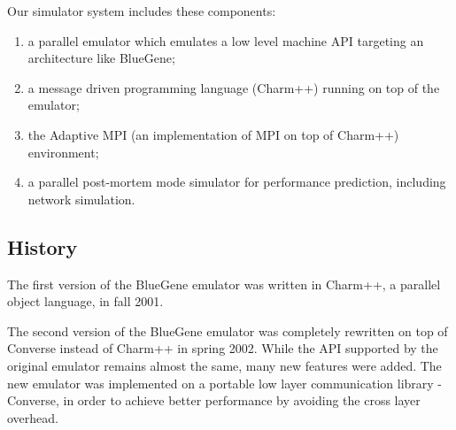 \documentclass[10pt]{article}
\begin{document}
Our simulator system includes these components: 
\begin{enumerate}
        \item a parallel emulator which emulates a low level machine API targeting an architecture like BlueGene; 
\item a message driven programming language (Charm++) running on top of the emulator; 
        \item the Adaptive MPI (an implementation of MPI on top of Charm++) environment; 
        \item a parallel post-mortem mode simulator for performance prediction, including network simulation. 
\end{enumerate}

\subsection{History}

        The first version of the BlueGene emulator was written in Charm++, a 
parallel object language, in fall 2001. 

        The second version of the BlueGene emulator was completely rewritten on top 
of Converse instead of Charm++ in spring 2002. 
        While the API supported by the original emulator remains almost the same,
many new features were added.
The new emulator was implemented on a portable low layer communication 
library - Converse, in order to achieve better 
performance by avoiding the cross layer overhead.
\end{document}
